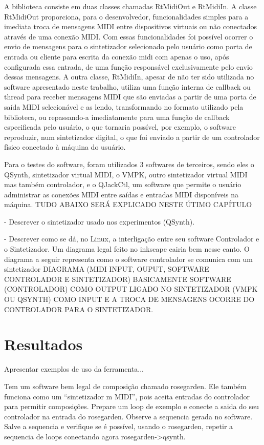 \documentclass[12pt]{report}
\begin{document}
A biblioteca consiste em duas classes chamadas RtMidiOut e RtMidiIn. A classe RtMidiOut proporciona, para o desenvolvedor, funcionalidades simples para a imediata troca de mensagens MIDI entre dispositivos virtuais ou não conectados através de uma conexão MIDI. Com essas funcionalidades foi possível ocorrer o envio de mensagens para o sintetizador selecionado pelo usuário como porta de entrada ou cliente para escrita da conexão midi com apenas o uso, após configurada essa entrada, de uma função responsável exclusivamente pelo envio dessas mensagens. A outra classe, RtMidiIn, apesar de não ter sido utilizada no software apresentado neste trabalho, utiliza uma função interna de callback ou thread para receber mensagens MIDI que são enviadas a partir de uma porta de saída MIDI selecionável e as lendo, transformando no formato utilizado pela biblioteca, ou repassando-a imediatamente para uma função de callback especificada pelo usuário, o que tornaria possível, por exemplo, o software reproduzir, num sintetizador digital, o que foi enviado a partir de um controlador físico conectado à máquina do usuário.

Para o testes do software, foram utilizados 3 softwares de terceiros, sendo eles o QSynth, sintetizador virtual MIDI, o VMPK, outro sintetizador virtual MIDI mas também controlador, e o QJackCtl, um software que permite o usuário administrar as conexões MIDI entre saídas e entradas MIDI disponíveis na máquina.
TUDO ABAIXO SERÁ EXPLICADO NESTE ÚTIMO CAPÍTULO

- Descrever o sintetizador usado nos experimentos (QSynth).


- Descrever como se dá, no Linux, a interligação entre seu software
Controlador e o Sintetizador. Um diagrama legal feito no inkscape
cairia bem nesse canto.
O diagrama a seguir representa como o software controlador se comunica com um sintetizador
DIAGRAMA (MIDI INPUT, OUPUT, SOFTWARE CONTROLADOR E SINTETIZADOR)
BASICAMENTE SOFTWARE (CONTROLADOR) COMO OUTPUT LIGADO NO SINTETIZADOR (VMPK OU QSYNTH) COMO INPUT E A TROCA DE MENSAGENS OCORRE DO CONTROLADOR PARA O SINTETIZADOR.

\chapter{Resultados}
\label{cha:resultados}

Apresentar exemplos de uso da ferramenta...

Tem um software bem legal de composição chamado rosegarden. Ele também
funciona como um ``sintetizador m MIDI'', pois aceita entradas do
controlador para permitir composições. Prepare um loop de exemplo e
conecte a saida do seu controlador na entrada do rosegarden. Observe a
sequencia gerada no software. Salve a sequencia e verifique se é
possível, usando o rosegarden, repetir a sequencia de loops conectando
agora rosegarden->qsynth.
\end{document}
